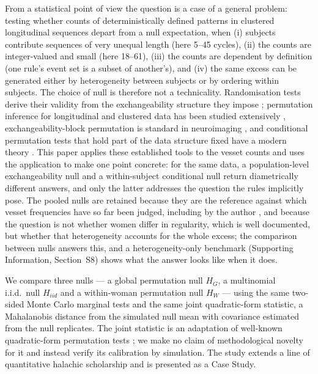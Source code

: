 \documentclass[12pt]{article}
\newcommand{\HG}{H_{G}}
\newcommand{\HI}{H_{iid}}
\newcommand{\HW}{H_{W}}
\begin{document}
From a statistical point of view the question is a case of a general problem: testing
whether counts of deterministically defined patterns in clustered longitudinal sequences
depart from a null expectation, when (i) subjects contribute sequences of very unequal length
(here 5--45 cycles), (ii) the counts are integer-valued and small (here 18--61), (iii) the counts are
dependent by definition (one rule's event set is a subset of another's), and (iv) the
same excess can be generated either by heterogeneity between subjects or by ordering
within subjects. The choice of null is therefore not a technicality. Randomisation tests
derive their validity from the exchangeability structure they impose
\citep{edgington2007,good2005}; permutation inference for longitudinal and clustered
data has been studied extensively \citep{friedrich2017,lee2012}, exchangeability-block
permutation is standard in
neuroimaging \citep{nichols2002,winkler2014}, and conditional permutation tests that
hold part of the data structure fixed have a modern theory
\citep{berrett2020,hemerik2018}. This paper applies these established tools to the
vesset counts and uses the application to make one point concrete: for the same data,
a population-level exchangeability null and a within-subject conditional null return
diametrically different answers, and only the latter addresses the question the rules
implicitly pose. The pooled nulls are retained because they are the reference against
which vesset frequencies have so far been judged, including by the author
\citep{ross2022phd}, and because the question is not whether women differ in regularity,
which is well documented, but whether that heterogeneity accounts for the whole excess;
the comparison between nulls answers this, and a heterogeneity-only benchmark (Supporting
Information, Section~S8) shows what the answer looks like when it does.

We compare three nulls --- a global permutation null $\HG$, a multinomial i.i.d.\ null
$\HI$ and a within-woman permutation null $\HW$ --- using the same two-sided Monte Carlo
marginal tests and the same joint quadratic-form statistic, a Mahalanobis distance from
the simulated null mean with covariance estimated from the null replicates. The joint
statistic is an adaptation of well-known quadratic-form permutation tests
\citep{anderson2001,pesarin2010,szekely2013}; we make no claim of methodological
novelty for it and instead verify its calibration by simulation. The study extends a
line of quantitative halachic scholarship \citep{ross2022markov,ross2019reliability,
ross2026statistical,ross2022phd} and is presented as a Case Study.
\end{document}
